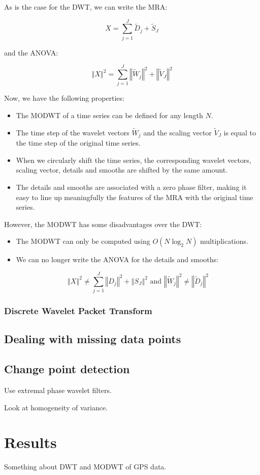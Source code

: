 \documentclass[main.tex]{subfiles}
\begin{document}
As is the case for the DWT, we can write the MRA:

\begin{equation}
X = \sum_{j = 1}^{J} \widetilde{D}_j + \widetilde{S}_J
\end{equation}

and the ANOVA:

\begin{equation}
\left\Vert X \right\Vert ^2 = \sum_{j = 1}^{J} \left\Vert \widetilde{W}_j \right\Vert ^2 + \left\Vert \widetilde{V}_J \right\Vert ^2
\end{equation}

Now, we have the following properties:

\begin{itemize}
	\item The MODWT of a time series can be defined for any length $N$.
	\item The time step of the wavelet vectors $\widetilde{W}_j$ and the scaling vector $\widetilde{V}_J$ is equal to the time step of the original time series.
	\item When we circularly shift the time series, the corresponding wavelet vectors, scaling vector, details and smooths are shifted by the same amount.
	\item The details and smooths are associated with a zero phase filter, making it easy to line up meaningfully the features of the MRA with the original time series.
\end{itemize}

However, the MODWT has some disadvantages over the DWT:

\begin{itemize}
	\item The MODWT can only be computed using $O \left( N \log_2 N \right)$ multiplications.
	\item We can no longer write the ANOVA for the details and smooths:

\begin{equation}
\left\Vert X \right\Vert ^2 \neq \sum_{j = 1}^{J} \left\Vert D_j \right\Vert ^2 + \left\Vert S_J \right\Vert ^2 \text{ and } \left\Vert \widetilde{W}_j \right\Vert ^2 \neq \left\Vert \widetilde{D}_j \right\Vert ^2
\end{equation}

\end{itemize}

\subsection{Discrete Wavelet Packet Transform}

\section{Dealing with missing data points}

\section{Change point detection}

Use extremal phase wavelet filters.

Look at homogeneity of variance.

\chapter{Results}

Something about DWT and MODWT of GPS data.
\end{document}
